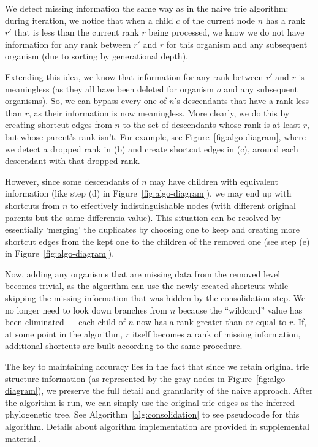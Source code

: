 We detect missing information the same way as in the naive trie algorithm: during iteration, we notice that when a child $c$ of the current node $n$ has a rank $r'$ that is less than the current rank $r$ being processed, we know we do not have information for any rank between $r'$ and $r$ for this organism and any subsequent organism (due to sorting by generational depth).

Extending this idea, we know that information for any rank between $r'$ and $r$ is meaningless (as they all have been deleted for organism $o$ and any subsequent organisms). 
So, we can bypass every one of $n$'s descendants that have a rank less than $r$, as their information is now meaningless.
More clearly, we do this by creating shortcut edges from $n$ to the set of descendants whose rank is at least $r$, but whose parent's rank isn't. For example, see Figure~\ref{fig:algo-diagram}, where we detect a dropped rank in (b) and create shortcut edges in (c), around each descendant with that dropped rank.

However, since some descendants of $n$ may have children with equivalent information (like step (d) in Figure~\ref{fig:algo-diagram}), we may end up with shortcuts from $n$ to effectively indistinguishable nodes (with different original parents but the same differentia value).
This situation can be resolved by essentially `merging' the duplicates by choosing one to keep and creating more shortcut edges from the kept one to the children of the removed one (see step (e) in Figure~\ref{fig:algo-diagram}).

Now, adding any organisms that are missing data from the removed level becomes trivial, as the algorithm can use the newly created shortcuts while skipping the missing information that was hidden by the consolidation step.
We no longer need to look down branches from $n$ because the ``wildcard'' value has been eliminated --- each child of $n$ now has a rank greater than or equal to $r$.
If, at some point in the algorithm, $r$ itself becomes a rank of missing information, additional shortcuts are built according to the same procedure.



The key to maintaining accuracy lies in the fact that since we retain original trie structure information (as represented by the gray nodes in Figure~\ref{fig:algo-diagram}), we preserve the full detail and granularity of the naive approach.
After the algorithm is run, we can simply use the original trie edges as the inferred phylogenetic tree.
See Algorithm~\ref{alg:consolidation} to see pseudocode for this algorithm.
Details about algorithm implementation are provided in supplemental material \citep{supplemental}.
